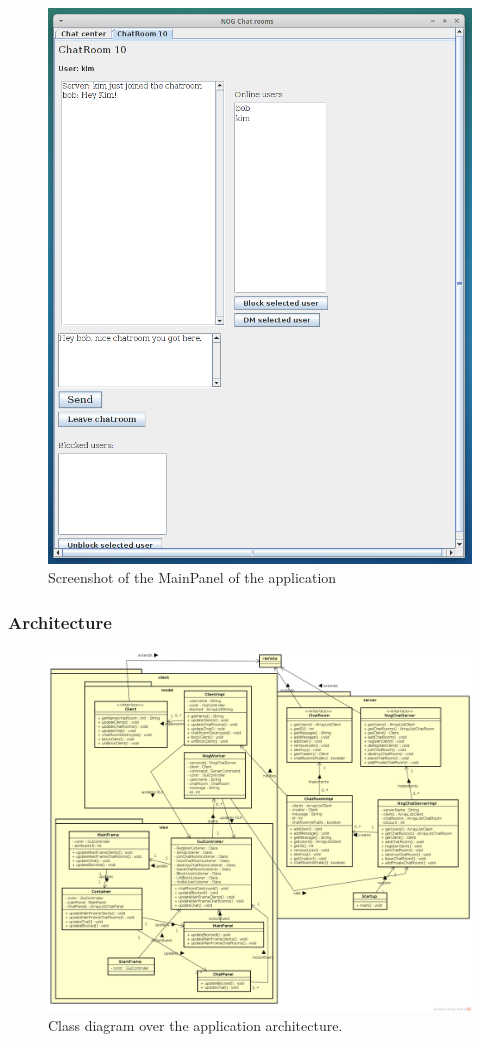 \documentclass[a4paper, 11pt]{article}
\begin{document}
\begin{figure}[H]
\includegraphics[scale=0.50]{assignment2_4.png}
\caption{Screenshot of the MainPanel of the application}
\end{figure}
\subsubsection{Architecture}
\begin{figure}[H]
\includegraphics[scale=0.30]{assignment3_architecture.png}
\caption{Class diagram over the application architecture.}
\end{figure}
\end{document}
